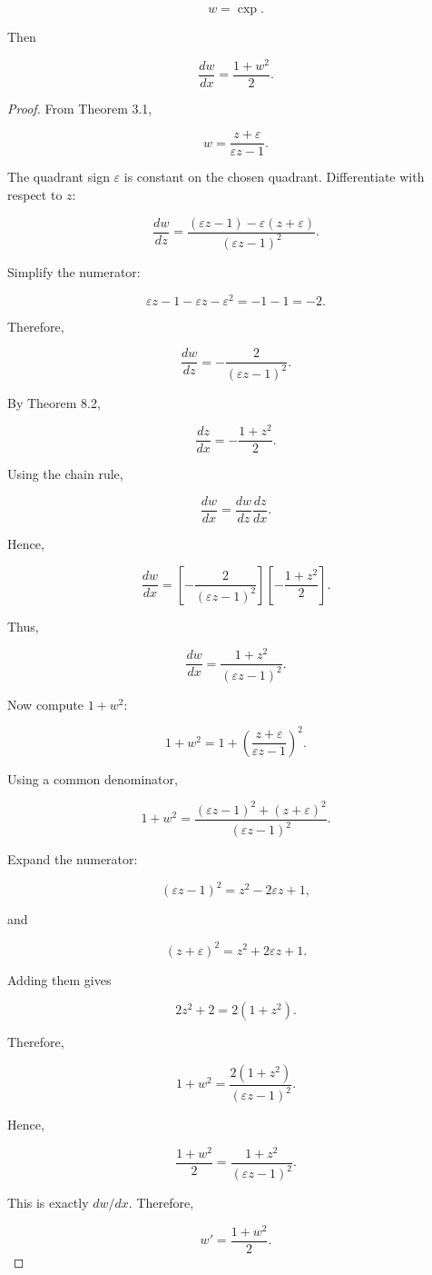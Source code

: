 \documentclass[11pt,oneside,openany]{book}
\begin{document}
\[
w=\operatorname{cxp}.
\]

Then

\[
\boxed{ \frac{dw}{dx} = \frac{1+w^2}{2} }.
\]

\begin{proof}
From Theorem 3.1,

\[
w = \frac{z+\varepsilon} {\varepsilon z-1}.
\]

The quadrant sign \(\varepsilon\) is constant on the chosen quadrant. Differentiate with respect to \(z\):

\[
\frac{dw}{dz} = \frac{ (\varepsilon z-1) - \varepsilon(z+\varepsilon) } {(\varepsilon z-1)^2}.
\]

Simplify the numerator:

\[
\varepsilon z-1-\varepsilon z-\varepsilon^2 = -1-1 = -2.
\]

Therefore,

\[
\frac{dw}{dz} = -\frac2{(\varepsilon z-1)^2}.
\]

By Theorem 8.2,

\[
\frac{dz}{dx} = -\frac{1+z^2}{2}.
\]

Using the chain rule,

\[
\frac{dw}{dx} = \frac{dw}{dz}\frac{dz}{dx}.
\]

Hence,

\[
\frac{dw}{dx} = \left[ -\frac2{(\varepsilon z-1)^2} \right] \left[ -\frac{1+z^2}{2} \right].
\]

Thus,

\[
\frac{dw}{dx} = \frac{1+z^2} {(\varepsilon z-1)^2}.
\]

Now compute \(1+w^2\):

\[
1+w^2 = 1+ \left( \frac{z+\varepsilon} {\varepsilon z-1} \right)^2.
\]

Using a common denominator,

\[
1+w^2 = \frac{ (\varepsilon z-1)^2+(z+\varepsilon)^2 } {(\varepsilon z-1)^2}.
\]

Expand the numerator:

\[
(\varepsilon z-1)^2 = z^2-2\varepsilon z+1,
\]

and

\[
(z+\varepsilon)^2 = z^2+2\varepsilon z+1.
\]

Adding them gives

\[
2z^2+2 = 2(1+z^2).
\]

Therefore,

\[
1+w^2 = \frac{2(1+z^2)} {(\varepsilon z-1)^2}.
\]

Hence,

\[
\frac{1+w^2}{2} = \frac{1+z^2} {(\varepsilon z-1)^2}.
\]

This is exactly \(dw/dx\). Therefore,

\[
\boxed{ w' = \frac{1+w^2}{2} }.
\]

\end{proof}
\end{document}
